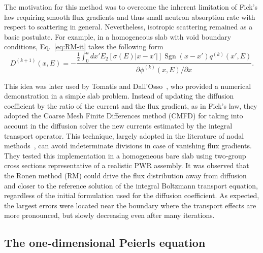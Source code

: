 The motivation for this method was to overcome the inherent limitation of Fick's law requiring smooth flux gradients and thus small neutron absorption rate with respect to scattering in general. Nevertheless, isotropic scattering remained as a basic postulate.
For example, in a homogeneous slab with void boundary conditions, Eq.~\eqref{eq:RM-it} takes the following form~\cite{Ronen-2004} 
\begin{equation}\label{eq:RM-it-1D-slab}
D^{(k+1)}(x,E) = -\frac{\displaystyle \frac{1}{2}\int_0^a dx' E_2[\sigma(E)\lvert
	x-x'\rvert]\operatorname{Sgn}(x-x')q^{(k)}(x',E)}
{\partial \phi^{(k)}(x,E)/\partial x}.
\end{equation}

This idea was later used by Tomatis and Dall'Osso~\cite{Tomatis-2011}, who provided a numerical demonstration in a simple slab problem. Instead of updating the diffusion coefficient by the ratio of the current and the flux gradient, as in Fick's law, they adopted the Coarse Mesh Finite Differences method (CMFD) for taking into account in the diffusion solver the new currents estimated by the integral transport operator. 
%
%
This technique, largely adopted in the literature of nodal methods~\cite{Smith-1983,Lawrence-1986}, can avoid indeterminate divisions in case of vanishing flux gradients. They tested this implementation in a homogeneous bare slab using two-group cross sections representative of a realistic PWR assembly. It was observed that the Ronen method (RM) could drive the flux distribution away from diffusion and closer to the reference solution of the integral Boltzmann transport equation, regardless of the initial formulation used for the diffusion coefficient. As expected, the largest errors were located near the boundary where the transport effects are more pronounced, but slowly decreasing even after many iterations.%

%
\subsection{The one-dimensional Peierls equation}
\label{sec:Peierls}


